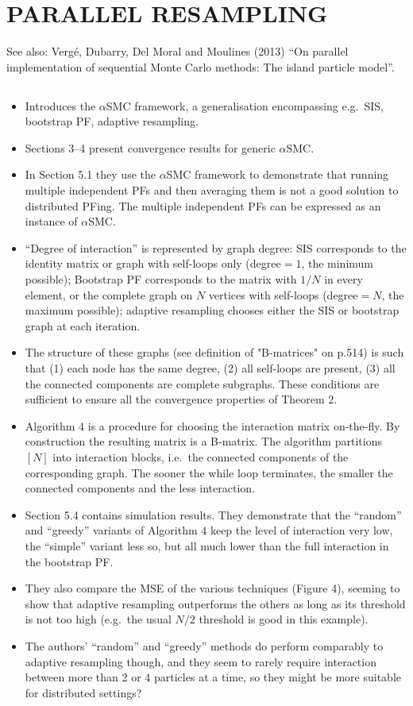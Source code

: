 \documentclass{article}
\begin{document}
%
\section*{PARALLEL RESAMPLING}
See also:
Verg\'e, Dubarry, Del Moral and Moulines (2013) ``On parallel implementation of sequential Monte Carlo methods: The island particle model''.

\subsection*{\cite{whiteley2016}}
\begin{itemize}
\item Introduces the $\alpha$SMC framework, a generalisation encompassing e.g.\ SIS, bootstrap PF, adaptive resampling.
\item Sections 3--4 present convergence results for generic $\alpha$SMC.
\item In Section 5.1 they use the $\alpha$SMC framework to demonstrate that running multiple independent PFs and then averaging them is not a good solution to distributed PFing. The multiple independent PFs can be expressed as an instance of $\alpha$SMC.
\item ``Degree of interaction'' is represented by graph degree: SIS corresponds to the identity matrix or graph with self-loops only (degree$=1$, the minimum possible); Bootstrap PF corresponds to the matrix with $1/N$ in every element, or the complete graph on $N$ vertices with self-loops (degree$=N$, the maximum possible); adaptive resampling chooses either the SIS or bootstrap graph at each iteration.
\item The structure of these graphs (see definition of "B-matrices" on p.514) is such that (1) each node has the same degree, (2) all self-loops are present, (3) all the connected components are complete subgraphs. These conditions are sufficient to ensure all the convergence properties of Theorem 2.
\item Algorithm 4 is a procedure for choosing the interaction matrix on-the-fly. By construction the resulting matrix is a B-matrix. The algorithm partitions $[N]$ into interaction blocks, i.e.\ the connected components of the corresponding graph. The sooner the while loop terminates, the smaller the connected components and the less interaction.
\item Section 5.4 contains simulation results. They demonstrate that the ``random'' and ``greedy'' variants of Algorithm 4 keep the level of interaction very low, the ``simple'' variant less so, but all much lower than the full interaction in the bootstrap PF.
\item They also compare the MSE of the various techniques (Figure 4), seeming to show that adaptive resampling outperforms the others as long as its threshold is not too high (e.g.\ the usual $N/2$ threshold is good in this example).
\item The authors' ``random'' and ``greedy'' methods do perform comparably to adaptive resampling though, and they seem to rarely require interaction between more than 2 or 4 particles at a time, so they might be more suitable for distributed settings?
\end{itemize}
\end{document}
